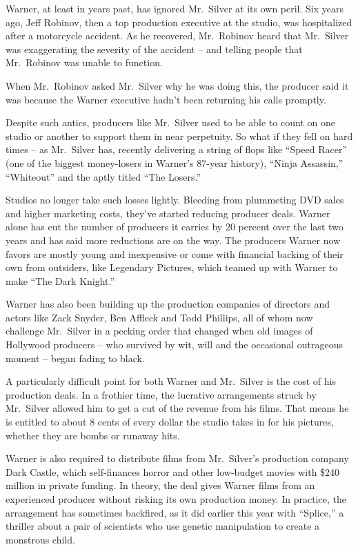 ﻿\documentclass[12pt]{article}
\begin{document}
Warner, at least in years past, has ignored Mr.~Silver at its own peril. Six years ago, Jeff
Robinov, then a top production executive at the studio, was hospitalized after a motorcycle
accident. As he recovered, Mr.~Robinov heard that Mr.~Silver was exaggerating the severity of the
accident -- and telling people that Mr.~Robinov was unable to function.

When Mr.~Robinov asked Mr.~Silver why he was doing this, the producer said it was because the Warner
executive hadn't been returning his calls promptly.

Despite such antics, producers like Mr.~Silver used to be able to count on one studio or another to
support them in near perpetuity. So what if they fell on hard times -- as Mr.~Silver has, recently
delivering a string of flops like ``Speed Racer'' (one of the biggest money-losers in Warner's
87-year history), ``Ninja Assassin,'' ``Whiteout'' and the aptly titled ``The Losers.''

Studios no longer take such losses lightly. Bleeding from plummeting DVD sales and higher marketing
costs, they've started reducing producer deals. Warner alone has cut the number of producers it
carries by 20 percent over the last two years and has said more reductions are on the way. The
producers Warner now favors are mostly young and inexpensive or come with financial backing of their
own from outsiders, like Legendary Pictures, which teamed up with Warner to make ``The Dark
Knight.''

Warner has also been building up the production companies of directors and actors like Zack Snyder,
Ben Affleck and Todd Phillips, all of whom now challenge Mr.~Silver in a pecking order that changed
when old images of Hollywood producers -- who survived by wit, will and the occasional outrageous
moment -- began fading to black.

A particularly difficult point for both Warner and Mr.~Silver is the cost of his production deals.
In a frothier time, the lucrative arrangements struck by Mr.~Silver allowed him to get a cut of the
revenue from his films. That means he is entitled to about 8 cents of every dollar the studio takes
in for his pictures, whether they are bombs or runaway hits.

Warner is also required to distribute films from Mr.~Silver's production company Dark Castle, which
self-finances horror and other low-budget movies with \$240 million in private funding. In theory,
the deal gives Warner films from an experienced producer without risking its own production money.
In practice, the arrangement has sometimes backfired, as it did earlier this year with ``Splice,'' a
thriller about a pair of scientists who use genetic manipulation to create a monstrous child.
\end{document}
